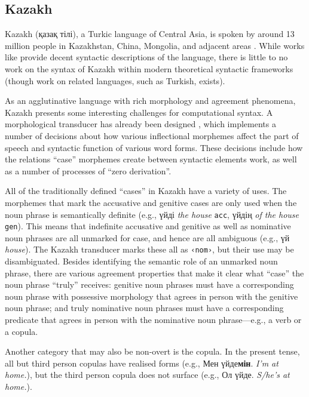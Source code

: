 \documentclass[a4paper,11pt, onecolumn,twoside]{article}
\newcommand{\gmk}[1]{\texttt{#1}}
\newcommand{\gloss}[1]{{\em #1}}
\newcommand{\tag}[1]{\texttt{‹#1›}}
\begin{document}
\subsection{Kazakh}\label{sec:kazakh}

Kazakh (қазақ тілі), a Turkic language of Central Asia, is spoken by around 13 million people in Kazakhstan, China, Mongolia, and adjacent areas \parencite{ethnologue}.  While works like \textcite{Balaqayev54} provide decent syntactic descriptions of the language, there is little to no work on the syntax of Kazakh within modern theoretical syntactic frameworks (though work on related languages, such as Turkish, exists).

As an agglutinative language with rich morphology and agreement phenomena, Kazakh presents some interesting challenges for computational syntax.  A morphological transducer has already been designed \parencite{Washington14}, which implements a number of decisions about how various inflectional morphemes affect the part of speech and syntactic function of various word forms.  These decisions include how the relations ``case'' morphemes create between syntactic elements work, as well as a number of processes of ``zero derivation''.

All of the traditionally defined ``cases'' in Kazakh have a variety of uses.  The morphemes that mark the accusative and genitive cases are only used when the noun phrase is semantically definite (e.g., үйді \gloss{the house} \gmk{acc}, үйдің \gloss{of the house} \gmk{gen}).  This means that indefinite accusative and genitive as well as nominative noun phrases are all unmarked for case, and hence are all ambiguous (e.g., үй \gloss{house}).  The Kazakh transducer marks these all as \tag{nom}, but their use may be disambiguated.  Besides identifying the semantic role of an unmarked noun phrase, there are various agreement properties that make it clear what ``case'' the noun phrase ``truly'' receives: genitive noun phrases must have a corresponding noun phrase with possessive morphology that agrees in person with the genitive noun phrase; and truly nominative noun phrases must have a corresponding predicate that agrees in person with the nominative noun phrase---e.g., a verb or a copula.

Another category that may also be non-overt is the copula.  In the present tense, all but third person copulas have realised forms (e.g., Мен үйде\textbf{мін}. \gloss{I'm at home.}), but the third person copula does not surface (e.g., Ол үйде. \gloss{S/he's at home.}).
\end{document}
